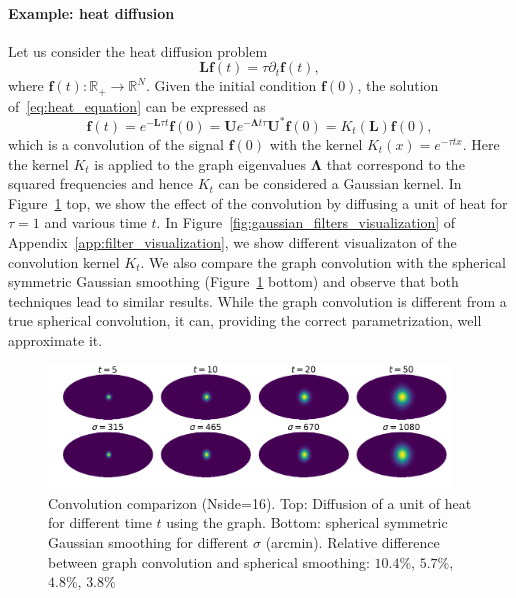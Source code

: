 \documentclass[preprint,12pt,authoryear]{elsarticle}
\renewcommand{\b}[1]{{\bm{#1}}}   %
\newcommand{\1}{\b{1}}              %
\newcommand{\0}{\b{0}}              %
\newcommand{\g}[1]{\b{#1}}
\renewcommand{\L}{\b{L}} %
\newcommand{\U}{\b{U}}
\newcommand{\bLambda}{\b{\Lambda}}
\begin{document}
\paragraph{Example: heat diffusion}
Let us consider the heat diffusion problem 
\begin{equation} \label{eq:heat_equation}
\L \b{f}(t) = \tau \partial_t \b{f}(t),
\end{equation}
where $\b{f}(t): \mathbb{R}_+ \rightarrow \mathbb{R}^N$. Given the initial condition 
$\b{f}(0)$, the solution of~\ref{eq:heat_equation} can be expressed as
\begin{equation}
\b{f}(t) = e^{-\L \tau t} \b{f}(0) = \U e^{-\bLambda t \tau} \U^* \g{f}(0) = K_t(\L) \b{f}(0), 
\end{equation}
which is a convolution of the signal $\b{f}(0)$ with the kernel $K_t(x)=e^{-\tau
t x}$. Here the kernel $K_t$ is applied to the graph eigenvalues $\bLambda$ that
correspond to the squared frequencies and hence $K_t$ can be considered a
Gaussian kernel. In Figure~\ref{fig:gaussian_filters_comparizon} top, we show
the effect of the convolution by diffusing a unit of heat for $\tau=1$ and various 
time $t$. In  Figure~\ref{fig:gaussian_filters_visualization} of
Appendix~\ref{app:filter_visualization}, we show different visualizaton of the
convolution kernel $K_t$. We also compare the graph convolution with the
spherical symmetric Gaussian smoothing
(Figure~\ref{fig:gaussian_filters_comparizon} bottom) and observe that both
techniques lead to similar results. While the graph convolution is different
from a true spherical convolution, it can, providing the correct
parametrization, well approximate it.

\begin{figure}[!ht]
\centering
\includegraphics[width=0.95\textwidth]{figures/gaussian_filters_sphere.pdf}
\caption{Convolution comparizon (Nside=16). 
Top: Diffusion of a unit of heat for different time $t$ using the graph. 
Bottom: spherical symmetric Gaussian smoothing for different $\sigma$ (arcmin). 
Relative difference between graph convolution and spherical smoothing: $10.4$\%, $5.7$\%, $4.8$\%, $3.8$\% }
\label{fig:gaussian_filters_comparizon}
\end{figure}
\end{document}

